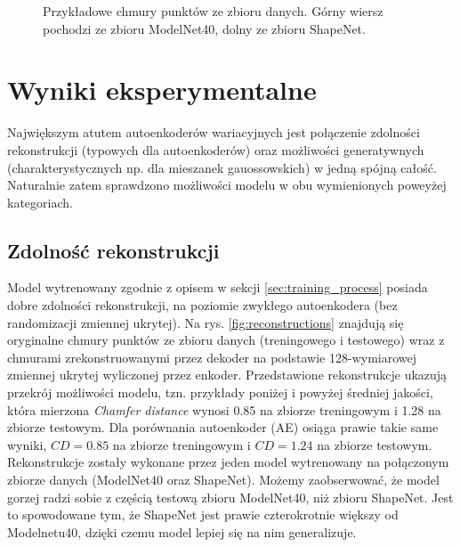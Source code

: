 \documentclass{iithesis}
\begin{document}
\begin{figure}[t]
    \caption{\label{fig:data_samples} Przykładowe chmury punktów ze zbioru danych.
    Górny wiersz pochodzi ze zbioru ModelNet40, dolny ze zbioru ShapeNet. }
\end{figure}

\chapter{Wyniki eksperymentalne}
Największym atutem autoenkoderów wariacyjnych jest połączenie zdolności rekonstrukcji
(typowych dla autoenkoderów) oraz możliwości generatywnych (charakterystycznych np.
dla mieszanek gauossowskich) w jedną spójną całość.
Naturalnie zatem sprawdzono możliwości modelu w obu wymienionych poweyżej kategoriach.

\section{Zdolność rekonstrukcji}
Model wytrenowany zgodnie z opisem w sekcji \ref{sec:training_process} posiada dobre zdolności
rekonstrukcji, na poziomie zwykłego autoenkodera (bez randomizacji zmiennej ukrytej). Na rys. \ref{fig:reconstructions}
znajdują się oryginalne chmury punktów ze zbioru danych (treningowego i testowego)
wraz z chmurami zrekonstruowanymi przez dekoder na podstawie 128-wymiarowej zmiennej ukrytej wyliczonej przez enkoder.
Przedstawione rekonstrukcje ukazują przekrój możliwości modelu, tzn. przykłady poniżej i powyżej średniej jakości,
która mierzona \textit{Chamfer distance} wynosi 0.85 na zbiorze treningowym i 1.28 na zbiorze testowym.
Dla porównania autoenkoder (AE) osiąga prawie takie same wyniki,
$CD = 0.85$ na zbiorze treningowym i $CD = 1.24$ na zbiorze testowym.
Rekonstrukcje zostały wykonane przez jeden model wytrenowany na połączonym zbiorze danych (ModelNet40 oraz ShapeNet).
Możemy zaobserwować, że model gorzej radzi sobie z częścią testową zbioru ModelNet40, niż zbioru ShapeNet.
Jest to spowodowane tym, że ShapeNet jest prawie czterokrotnie większy od Modelnetu40, dzięki czemu model lepiej
się na nim generalizuje.
\end{document}
